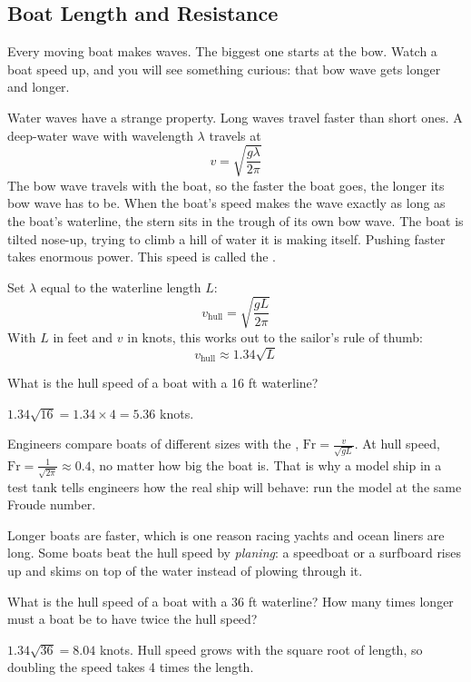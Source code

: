 \subsection{Boat Length and Resistance}

Every moving boat makes waves. The biggest one starts at the bow. Watch a
boat speed up, and you will see something curious: that bow wave gets
longer and longer.

Water waves have a strange property. Long waves travel faster than short
ones. A deep-water wave with wavelength $\lambda$ travels at
$$v = \sqrt{\frac{g\lambda}{2\pi}}$$
The bow wave travels with the boat, so the faster the boat goes, the longer
its bow wave has to be. When the boat's speed makes the wave exactly as long
as the boat's waterline, the stern sits in the trough of its own bow wave.
The boat is tilted nose-up, trying to climb a hill of water it is making
itself. Pushing faster takes enormous power. This speed is called the
.

Set $\lambda$ equal to the waterline length $L$:
$$v_{\text{hull}} = \sqrt{\frac{gL}{2\pi}}$$
With $L$ in feet and $v$ in knots, this works out to the sailor's rule of
thumb:
$$v_{\text{hull}} \approx 1.34\sqrt{L}$$

\begin{Worked}
\begin{Problem}
What is the hull speed of a boat with a 16 ft
waterline?
\end{Problem}
\begin{Solution}
$1.34\sqrt{16} = 1.34 \times 4 = 5.36$ knots.
\end{Solution}
\end{Worked}

Engineers compare boats of different sizes with the , $\text{Fr} = \frac{v}{\sqrt{gL}}$. At hull speed,
$\text{Fr} = \frac{1}{\sqrt{2\pi}} \approx 0.4$, no matter how big the boat
is. That is why a model ship in a test tank tells engineers how the real
ship will behave: run the model at the same Froude number.

Longer boats are faster, which is one reason racing yachts and ocean
liners are long. Some boats beat the hull speed by \emph{planing}: a
speedboat or a surfboard rises up and skims on top of the water instead of
plowing through it.

\begin{Exercise}[title={Longer Boat}, label=boat1]
What is the hull speed of a boat with a 36 ft waterline? How many times
longer must a boat be to have twice the hull speed?
\end{Exercise}
\begin{Answer}[ref=boat1]
$1.34\sqrt{36} = 8.04$ knots. Hull speed grows with the square root of
length, so doubling the speed takes 4 times the length.
\end{Answer}


